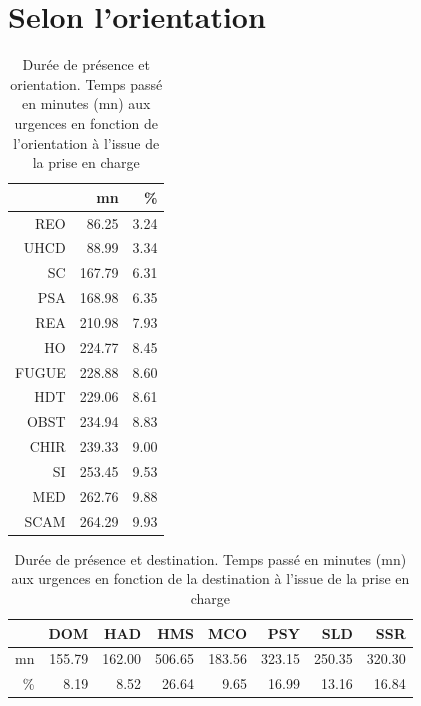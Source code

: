 \documentclass[12pt,english,french,twoside]{book}\usepackage[]{graphicx}\usepackage[]{color}
\begin{document}
\section{Selon l'orientation}
\begin{table}[ht]
\centering
\begin{tabular}{rrr}
  \hline
 & mn & \% \\ 
  \hline
REO & 86.25 & 3.24 \\ 
  UHCD & 88.99 & 3.34 \\ 
  SC & 167.79 & 6.31 \\ 
  PSA & 168.98 & 6.35 \\ 
  REA & 210.98 & 7.93 \\ 
  HO & 224.77 & 8.45 \\ 
  FUGUE & 228.88 & 8.60 \\ 
  HDT & 229.06 & 8.61 \\ 
  OBST & 234.94 & 8.83 \\ 
  CHIR & 239.33 & 9.00 \\ 
  SI & 253.45 & 9.53 \\ 
  MED & 262.76 & 9.88 \\ 
  SCAM & 264.29 & 9.93 \\ 
   \hline
\end{tabular}
\caption[Durée de présence et orientation]{Durée de présence et orientation. Temps passé en minutes (mn) aux urgences en fonction de l'orientation à l'issue de la prise en charge} 
\label{tab:duree_orientation}
\end{table}
\begin{table}[ht]
\centering
\begin{tabular}{rrrrrrrr}
  \hline
 & DOM & HAD & HMS & MCO & PSY & SLD & SSR \\ 
  \hline
mn & 155.79 & 162.00 & 506.65 & 183.56 & 323.15 & 250.35 & 320.30 \\ 
  \% & 8.19 & 8.52 & 26.64 & 9.65 & 16.99 & 13.16 & 16.84 \\ 
   \hline
\end{tabular}
\caption[Durée de présence et destination]{Durée de présence et destination. Temps passé en minutes (mn) aux urgences en fonction de la destination à l'issue de la prise en charge} 
\label{tab:duree_destination}
\end{table}
\end{document}
